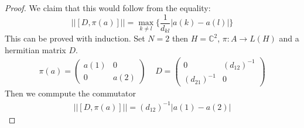\begin{proof}
    We claim that this would follow from the equality:
    \begin{equation}
        \big|\big|[D, \pi(a)]\big|\big| = \max_{k\neq l}
        \bigg\{\frac{1}{d_{kl}}\big|a(k) - a(l)\big|\bigg\}
        \label{induction}
    \end{equation}
    This can be proved with induction. Set $N=2$ then $H=\mathbb{C}^2$, $\pi:A\rightarrow L(H)$ and
    a hermitian matrix $D$.
    \begin{align}
        \pi(a) =
        \begin{pmatrix}
            a(1) & 0 \\
            0 & a(2)
        \end{pmatrix}
        \;\;\;\;
        D =
        \begin{pmatrix}
            0 & (d_{12})^{-1} \\
            (d_{21})^{-1} & 0
        \end{pmatrix}
    \end{align}
    Then we commpute the commutator
    \begin{align}
        \big|\big|[D, \pi(a)]\big|\big| = (d_{12})^{-1} \big| a(1) - a(2)\big|
    \end{align}


\end{proof}
